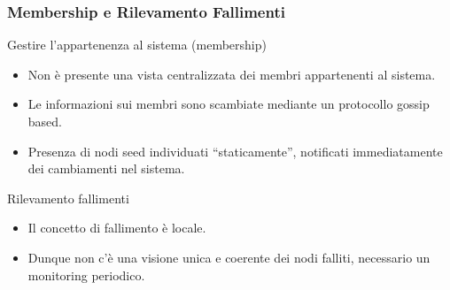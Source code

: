 \begin{frame}
  \frametitle{Membership e Rilevamento Fallimenti}
  \begin{block}{Gestire l'appartenenza al sistema (membership)}
  \begin{itemize}
  \item Non è presente una vista centralizzata dei membri appartenenti al sistema.
  \item Le informazioni sui membri sono scambiate mediante un protocollo \alert{gossip based}.
  \item Presenza di nodi \alert{seed} individuati ``staticamente'', notificati immediatamente dei cambiamenti nel sistema.
  \end{itemize}
  \end{block}
  \begin{block}{Rilevamento fallimenti}
  \begin{itemize}
  \item Il concetto di fallimento è locale.
  \item Dunque non c'è una visione unica e coerente dei nodi falliti, necessario un monitoring periodico.
  \end{itemize}
  \end{block}
\end{frame}


  

